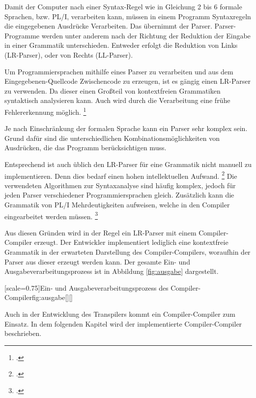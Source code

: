 Damit der Computer nach einer Syntax-Regel wie in Gleichung 2 bis 6 formale Sprachen, bzw. PL/I, verarbeiten kann, müssen in einem Programm Syntaxregeln die eingegebenen Ausdrücke Verarbeiten. 
Das übernimmt der Parser. Parser-Programme werden unter anderem nach der Richtung der Reduktion der Eingabe in einer Grammatik unterschieden.
Entweder erfolgt die Reduktion von Links (LR-Parser), oder von Rechts (LL-Parser).

Um Programmiersprachen mithilfe eines Parser zu verarbeiten und aus dem Eingegebenen-Quellcode Zwischencode zu erzeugen, ist es gängig einen LR-Parser zu verwenden.
Da dieser einen Großteil von kontextfreien Grammatiken syntaktisch analysieren kann.
Auch wird durch die Verarbeitung eine frühe Fehlererkennung möglich. \footcite{}

Je nach Einschränkung der formalen Sprache kann ein Parser sehr komplex sein. 
Grund dafür sind die unterschiedlichen Kombinationsmöglichkeiten von Ausdrücken, die das Programm berücksichtigen muss.

Entsprechend ist auch üblich den LR-Parser für eine Grammatik nicht manuell zu implementieren.
Denn dies bedarf einen hohen intellektuellen Aufwand. \footcite[Vgl. ][S. 27ff. ]{compibau}
Die verwendeten Algorithmen zur Syntaxanalyse sind häufig komplex, jedoch für jeden Parser verschiedener Programmiersprachen gleich. 
Zusätzlich kann die Grammatik von PL/I Mehrdeutigkeiten aufweisen, welche in den Compiler eingearbeitet werden müssen.
\footcite[Vgl. ][S. 262ff. ]{compibau}

Aus diesen Gründen wird in der Regel ein LR-Parser mit einem Compiler-Compiler erzeugt.
Der Entwickler implementiert lediglich eine kontextfreie Grammatik in der erwarteten Darstellung des Compiler-Compilers,
woraufhin der Parser aus dieser erzeugt werden kann. Der gesamte Ein- und Ausgabeverarbeitungsprozess ist in Abbildung \ref{fig:ausgabe} dargestellt.


[scale=0.75]{Ein- und Ausgabeverarbeitungsprozess des Compiler-Compiler}{fig:ausgabe}[][]
\pagebreak

Auch in der Entwicklung des Transpilers kommt ein Compiler-Compiler zum Einsatz. In dem folgenden Kapitel wird der implementierte Compiler-Compiler beschrieben.




